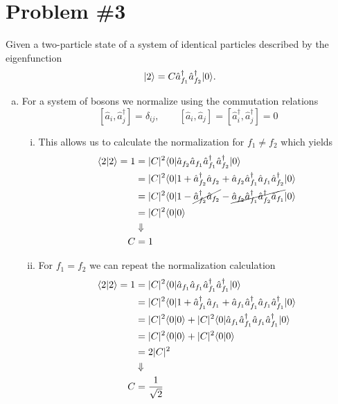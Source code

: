 \documentclass[11pt]{article}
\numberwithin{equation}{section}
\begin{document}
\pagebreak

\section{Problem \#3}
Given a two-particle state of a system of identical particles described by the eigenfunction
$$|{2}\rangle = C\hat{a}^{\dagger}_{f_1}\hat{a}^{\dagger}_{f_2}|{0}\rangle.$$

\begin{enumerate}[(a)]
\item For a system of bosons we normalize using the commutation relations
$$[\hat{a}_{i},\hat{a}^{\dagger}_{j}] = \delta_{ij},\qquad[\hat{a}_{i},\hat{a}_{j}] = [\hat{a}^{\dagger}_{i},\hat{a}^{\dagger}_{j}] = 0$$

\begin{enumerate}[(i)]
\item This allows us to calculate the normalization for $f_1\ne{f_2}$ which yields
\begin{align*}
\langle{2}|{2}\rangle = 1 &= |C|^2\langle{0}|\hat{a}_{f_2}\hat{a}_{f_1}\hat{a}^{\dagger}_{f_1}\hat{a}^{\dagger}_{f_2}|{0}\rangle\\
&= |C|^2\langle{0}|1 + \hat{a}_{f_2}^{\dagger}\hat{a}_{f_2} + \hat{a}_{f_2}\hat{a}^{\dagger}_{f_1}\hat{a}_{f_1}\hat{a}^{\dagger}_{f_2}|{0}\rangle\\
&= |C|^2\langle{0}|1 - \cancel{\hat{a}_{f_2}^{\dagger}\hat{a}_{f_2}} - \cancel{\hat{a}_{f_2}\hat{a}^{\dagger}_{f_1}\hat{a}^{\dagger}_{f_2}\hat{a}_{f_1}}|{0}\rangle\\
&= |C|^2\langle{0}|{0}\rangle\\
&\Downarrow\\
C &= 1
\end{align*}

\item For $f_1=f_2$ we can repeat the normalization calculation
\begin{align*}
\langle{2}|{2}\rangle = 1 &= |C|^2\langle{0}|\hat{a}_{f_1}\hat{a}_{f_1}\hat{a}^{\dagger}_{f_1}\hat{a}^{\dagger}_{f_1}|{0}\rangle\\
&= |C|^2\langle{0}|1 + \hat{a}_{f_1}^{\dagger}\hat{a}_{f_1} + \hat{a}_{f_1}\hat{a}^{\dagger}_{f_1}\hat{a}_{f_1}\hat{a}^{\dagger}_{f_1}|{0}\rangle\\
&= |C|^2\langle{0}|{0}\rangle + |C|^2\langle{0}|\hat{a}_{f_1}\hat{a}^{\dagger}_{f_1}\hat{a}_{f_1}\hat{a}^{\dagger}_{f_1}|{0}\rangle\\
&= |C|^2\langle{0}|{0}\rangle + |C|^2\langle{0}|{0}\rangle\\
&= 2|C|^2\\
&\Downarrow\\
C &= \frac{1}{\sqrt{2}}
\end{align*}


\end{enumerate}
\end{enumerate}
\end{document}
